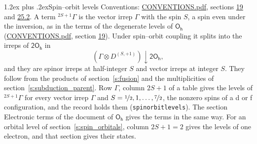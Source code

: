 \documentclass[10pt,a4paper]{article}
\makeatletter
\renewcommand\section{\@startsection{section}{1}{\z@}{-3ex plus -1ex minus -.2ex}%
  {1.2ex plus .2ex}{\normalfont\large\sffamily\bfseries\color{parttitle}}}
\numberwithin{equation}{section}
\newcommand{\grp}[1]{\mathsf{#1}}
\newcommand{\restr}[2]{#1\!\downarrow#2}
\newcommand{\irrJp}[2]{D^{(#1,#2)}}
\newcommand{\irrprod}{\otimes}
\newcommand{\term}[2]{{}^{#1}#2}
\makeatother
\begin{document}
\section{Spin--orbit levels}\label{s:spin_orbit}
Conventions: \href{../../CONVENTIONS.pdf}{CONVENTIONS.pdf}, sections \href{../../../rotation/CONVENTIONS.pdf\#conv.19}{19} and \href{../../CONVENTIONS.pdf\#conv.25.2}{25.2}.
\leavevmode\label{n:local.spin}\label{n:symbol.term}A term $\term{2S+1}{\Gamma}$ is the vector irrep $\Gamma$ with the spin $S$, a spin even under the inversion, as in the terms of the degenerate levels of \href{../../../rotation/data/pdf/Oh.pdf}{$\grp{O_{h}}$} (\href{../../CONVENTIONS.pdf}{CONVENTIONS.pdf}, section \href{../../../rotation/CONVENTIONS.pdf\#conv.19}{19}). Under spin--orbit coupling it splits into the irreps of $\grp{2O_{h}}$ in
\begin{equation}\label{e:spinorbit}\restr{(\Gamma \irrprod \irrJp{S}{+1})}{\grp{2O_{h}}},\end{equation}
and they are spinor irreps at half-integer $S$ and vector irreps at integer $S$. They follow from the products of section~\ref{s:fusion} and the multiplicities of section~\ref{s:subduction_parent}. Row $\Gamma$, column $2S + 1$ of a table gives the levels of $\term{2S+1}{\Gamma}$ for every vector irrep $\Gamma$ and $S = \nicefrac{1}{2}, 1, \dots, \nicefrac{7}{2}$, the nonzero spins of a d or f configuration, and the record holds them (\texttt{spinorbitlevels}). The section Electronic terms of the document of \href{../../../rotation/data/pdf/Oh.pdf}{$\grp{O_{h}}$} gives the terms in the same way. For an orbital level of section~\ref{s:spin_orbitals}, column $2S + 1 = 2$ gives the levels of one electron, and that section gives their states.
\end{document}
